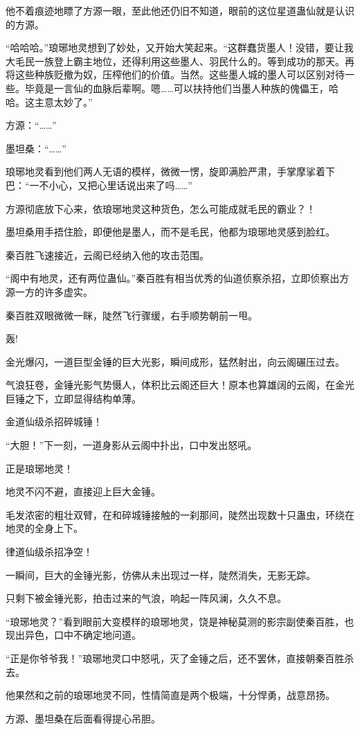 \begin{this_body}
他不着痕迹地瞟了方源一眼，至此他还仍旧不知道，眼前的这位星道蛊仙就是认识的方源。

“哈哈哈。”琅琊地灵想到了妙处，又开始大笑起来。“这群蠢货墨人！没错，要让我大毛民一族登上霸主地位，还得利用这些墨人、羽民什么的。等到成功的那天。再将这些种族贬撤为奴，压榨他们的价值。当然。这些墨人城的墨人可以区别对待一些。毕竟是一言仙的血脉后辈啊。嗯……可以扶持他们当墨人种族的傀儡王，哈哈。这主意太妙了。”

方源：“……”

墨坦桑：“……”

琅琊地灵看到他们两人无语的模样，微微一愣，旋即满脸严肃，手掌摩挲着下巴：“一不小心，又把心里话说出来了吗……”

方源彻底放下心来，依琅琊地灵这种货色，怎么可能成就毛民的霸业？！

墨坦桑用手捂住脸，即便他是墨人，而不是毛民，他都为琅琊地灵感到脸红。

秦百胜飞速接近，云阁已经纳入他的攻击范围。

“阁中有地灵，还有两位蛊仙。”秦百胜有相当优秀的仙道侦察杀招，立即侦察出方源一方的许多虚实。

秦百胜双眼微微一眯，陡然飞行骤缓，右手顺势朝前一甩。

轰!

金光爆闪，一道巨型金锤的巨大光影，瞬间成形，猛然射出，向云阁碾压过去。

气浪狂卷，金锤光影气势慑人，体积比云阁还巨大！原本也算雄阔的云阁，在金光巨锤之下，立即显得结构单薄。

金道仙级杀招碎城锤！

“大胆！”下一刻，一道身影从云阁中扑出，口中发出怒吼。

正是琅琊地灵！

地灵不闪不避，直接迎上巨大金锤。

毛发浓密的粗壮双臂，在和碎城锤接触的一刹那间，陡然出现数十只蛊虫，环绕在地灵的全身上下。

律道仙级杀招净空！

一瞬间，巨大的金锤光影，仿佛从未出现过一样，陡然消失，无影无踪。

只剩下被金锤光影，拍击过来的气浪，响起一阵风澜，久久不息。

“琅琊地灵？”看到眼前大变模样的琅琊地灵，饶是神秘莫测的影宗副使秦百胜，也现出异色，口中不确定地问道。

“正是你爷爷我！”琅琊地灵口中怒吼，灭了金锤之后，还不罢休，直接朝秦百胜杀去。

他果然和之前的琅琊地灵不同，性情简直是两个极端，十分悍勇，战意昂扬。

方源、墨坦桑在后面看得提心吊胆。


\end{this_body}
